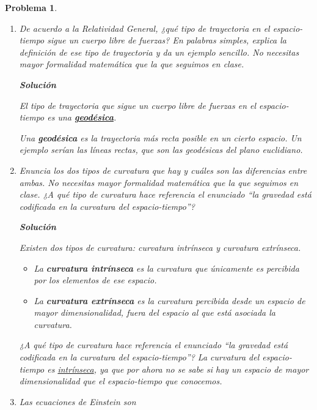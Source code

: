 \documentclass[12pt]{article}
\theoremstyle{break}
\newtheorem{exercise}{Problema}
\theoremstyle{nonumberbreak}
\newcommand*{\inlinesol}{\vspace*{10pt}\textbf{Solución}\vspace*{10pt}}
\begin{document}
    \pagebreak
    \begin{exercise}
        \begin{enumerate}[label = \alph*)]
            \item De acuerdo a la Relatividad General, ¿qué tipo de trayectoria en el espacio-tiempo sigue un cuerpo libre de fuerzas? En palabras simples, explica la definición de ese tipo de trayectoria y da un ejemplo sencillo. No necesitas mayor formalidad matemática que la que seguimos en clase.
            
            \inlinesol

            El tipo de trayectoria que sigue un cuerpo libre de fuerzas en el espacio-tiempo es una \ul{\textbf{geodésica}}.\par

            Una \textbf{geodésica} es la trayectoria más recta posible en un cierto espacio. Un ejemplo serían las líneas rectas, que son las geodésicas del plano euclidiano.

            \item Enuncia los dos tipos de curvatura que hay y cuáles son las diferencias entre ambas. No necesitas mayor formalidad matemática que la que seguimos en clase. ¿A qué tipo de curvatura hace referencia el enunciado ``la gravedad está codificada en la curvatura del espacio-tiempo''?
            
            \inlinesol

            Existen dos tipos de curvatura: curvatura intrínseca y curvatura extrínseca.

            \begin{itemize}[label = \textbullet]
                \item La \textbf{curvatura intrínseca} es la curvatura que únicamente es percibida por los \emph{elementos} de ese espacio. 
                \item La \textbf{curvatura extrínseca} es la curvatura percibida desde un espacio de mayor dimensionalidad, fuera del espacio al que está asociada la curvatura.
            \end{itemize}

            ¿A qué tipo de curvatura hace referencia el enunciado ``la gravedad está codificada en la curvatura del espacio-tiempo''? La curvatura del espacio-tiempo es \ul{intrínseca}, ya que por ahora no se sabe si hay un espacio de mayor dimensionalidad que el espacio-tiempo que conocemos.

            \item Las ecuaciones de Einstein son
            

\end{enumerate}
\end{exercise}
\end{document}
